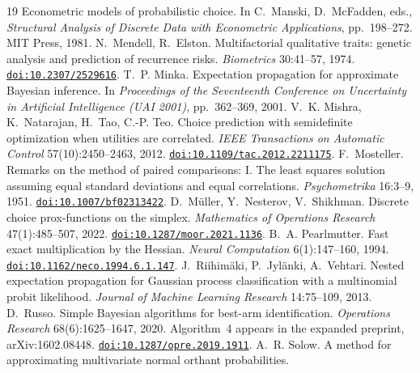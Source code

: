 \documentclass[11pt]{article}
\begin{document}
\begin{thebibliography}{19}
Econometric models of probabilistic choice. In C.~Manski, D.~McFadden,
eds., \emph{Structural Analysis of Discrete Data with Econometric
Applications}, pp.~198--272. MIT Press, 1981.
 N.~Mendell, R.~Elston.
Multifactorial qualitative traits: genetic analysis and prediction of
recurrence risks. \emph{Biometrics} 30:41--57, 1974.
\href{https://doi.org/10.2307/2529616}{\nolinkurl{doi:10.2307/2529616}}.
 T.~P. Minka. Expectation propagation
for approximate Bayesian inference. In \emph{Proceedings of the
Seventeenth Conference on Uncertainty in Artificial Intelligence (UAI
2001)}, pp.~362--369, 2001.
V.~K. Mishra, K.~Natarajan, H.~Tao, C.-P. Teo. Choice prediction with
semidefinite optimization when utilities are correlated. \emph{IEEE
Transactions on Automatic Control} 57(10):2450--2463, 2012.
\href{https://doi.org/10.1109/tac.2012.2211175}{\nolinkurl{doi:10.1109/tac.2012.2211175}}.
 F.~Mosteller. Remarks on the
method of paired comparisons: I. The least squares solution assuming
equal standard deviations and equal correlations. \emph{Psychometrika}
16:3--9, 1951.
\href{https://doi.org/10.1007/bf02313422}{\nolinkurl{doi:10.1007/bf02313422}}.
D.~M\"uller, Y.~Nesterov, V.~Shikhman. Discrete choice prox-functions on
the simplex. \emph{Mathematics of Operations Research} 47(1):485--507,
2022.
\href{https://doi.org/10.1287/moor.2021.1136}{\nolinkurl{doi:10.1287/moor.2021.1136}}.
 B.~A. Pearlmutter.
Fast exact multiplication by the Hessian. \emph{Neural Computation}
6(1):147--160, 1994.
\href{https://doi.org/10.1162/neco.1994.6.1.147}{\nolinkurl{doi:10.1162/neco.1994.6.1.147}}.
 J.~Riihim\"aki, P.~Jyl\"anki, A.~Vehtari. Nested
expectation propagation for Gaussian process classification with a
multinomial probit likelihood. \emph{Journal of Machine Learning
Research} 14:75--109, 2013.
 D.~Russo. Simple Bayesian algorithms
for best-arm identification. \emph{Operations Research}
68(6):1625--1647, 2020. Algorithm~4 appears in the expanded preprint,
arXiv:1602.08448.
\href{https://doi.org/10.1287/opre.2019.1911}{\nolinkurl{doi:10.1287/opre.2019.1911}}.
 A.~R. Solow.
A method for approximating multivariate normal orthant probabilities.

\end{thebibliography}
\end{document}
